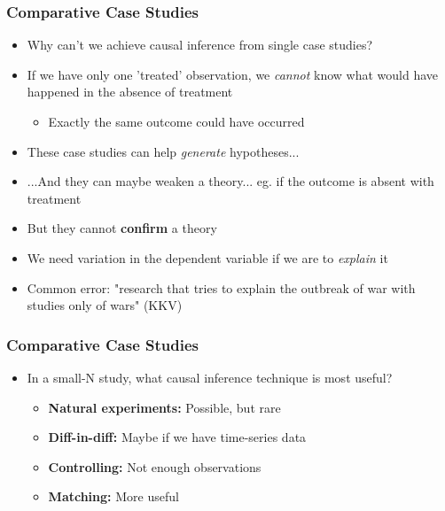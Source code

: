 \documentclass[xcolor=x11names,compress]{beamer}\usepackage[]{graphicx}\usepackage[]{color}
\renewcommand{\(}{\begin{columns}}
\renewcommand{\)}{\end{columns}}
\newcommand{\<}[1]{\begin{column}{#1}}
\renewcommand{\>}{\end{column}}
\begin{document}
\begin{frame}
\frametitle{Comparative Case Studies}
\begin{itemize}
\item Why can't we achieve causal inference from single case studies?
\pause
\item If we have only one 'treated' observation, we \textit{cannot} know what would have happened in the absence of treatment
\begin{itemize}
\item Exactly the same outcome could have occurred
\end{itemize}
\pause
\item These case studies can help \textit{generate} hypotheses...
\pause
\item ...And they can maybe weaken a theory... eg. if the outcome is absent with treatment
\pause
\item But they cannot \textbf{confirm} a theory
\pause
\item We need variation in the dependent variable if we are to \textit{explain} it
\pause
\item Common error: "research that tries to explain the outbreak of war with studies only of wars" (KKV)
\end{itemize}
\end{frame}

\begin{frame}
\frametitle{Comparative Case Studies}
\begin{itemize}
\item In a small-N study, what causal inference technique is most useful?
\pause
\begin{itemize}
\item \textbf{Natural experiments:} Possible, but rare
\pause
\item \textbf{Diff-in-diff:} Maybe if we have time-series data
\pause
\item \textbf{Controlling:} Not enough observations
\pause
\item \textbf{Matching:} More useful
\end{itemize}
\end{itemize}
\end{frame}
\end{document}
